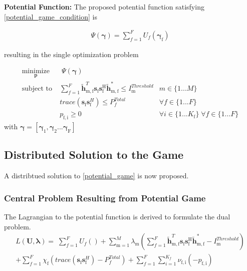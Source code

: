 \documentclass[12pt,a4paper]{report}
\begin{document}
\textbf{Potential Function:} The proposed potential function satisfying \eqref{potential_game_condition} is 

\begin{gather*} \label{Potential_Function}
\Psi(\mathbf{\gamma}) = \sum_{f = 1}^{F} U_f(\mathbf{\gamma_{\mathrm{f}}}) 
\end{gather*}

resulting in the single optimization problem 
	
		\begin{subequations}
	\label{optim}
	\begin{align}
	    \underset{\mathbf{p}}{\text{minimize}}
	    & \; \Psi(\mathbf{\gamma}) \label{potential_game} \\
	    \text{subject to} \; &
	  \sum^F_{f=1} \mathbf{\tilde{h}}_{\mathrm{m,f}}^T  \mathbf{s}_{\mathrm{f}} 						
	\mathbf{s_{\mathrm{f}}^{\mathrm{H}}} \mathbf{\tilde{h}_{\mathrm{m,f}}^*} \leq I^{Threshold}		
	_{\mathrm{m}} & m \in \{1 ...M\} 
		\label{interference_const}\\
        & trace(\mathbf{s}_\mathrm{f}\mathbf{s}_\mathrm{f}^H)  \leq P^{Total}_{f}  \label{power_const}
        & \forall f \in \{1 ... F\}\\
        & p_{\mathrm{f,i}} \geq 0 &  \forall i \in \{1 ...K_{\mathrm{f}}\} \; \forall f \in \{1 ... F\}\label{pos_power_const}
	\end{align}
	\end{subequations}
	with $\mathbf{\gamma}= [\mathbf{\gamma_{\mathrm{1}}},\mathbf{\gamma_{\mathrm{2}}}...\mathbf{\gamma_{\mathrm{F}}}]$


\subsection{Distributed Solution to the Game}
A distribtued solution to \eqref{potential_game} is now proposed.
\subsubsection{Central Problem Resulting from Potential Game}
The Lagrangian to the potential function is derived to formulate the dual problem. 
\begin{multline}
L(\mathbf{U,\lambda}) = 
\;
\sum_{f=1}^F U_f() 
+
\sum_{\mathrm{m=1}}^M \lambda_{\mathrm{m}}
(	  \sum^F_{f=1} \mathbf{\tilde{h}}_{\mathrm{m,f}}^T  \mathbf{s}_{\mathrm{f}} 						
	\mathbf{s_{\mathrm{f}}^{\mathrm{H}}} \mathbf{\tilde{h}_{\mathrm{m,f}}^*} - I^{Threshold}		
	_{\mathrm{m}} )
\\
+ 
\sum_{f=1}^F
\chi_{\mathrm{f}}(trace(\mathbf{s}_\mathrm{f}\mathbf{s}_\mathrm{f}^H)-P^{Total}_{f} )
+
\sum_{f=1}^F 
\sum_{i=1}^{K_f}
\nu_{\mathrm{f,i}}(-p_{\mathrm{f,i}})
\end{multline}
\end{document}
